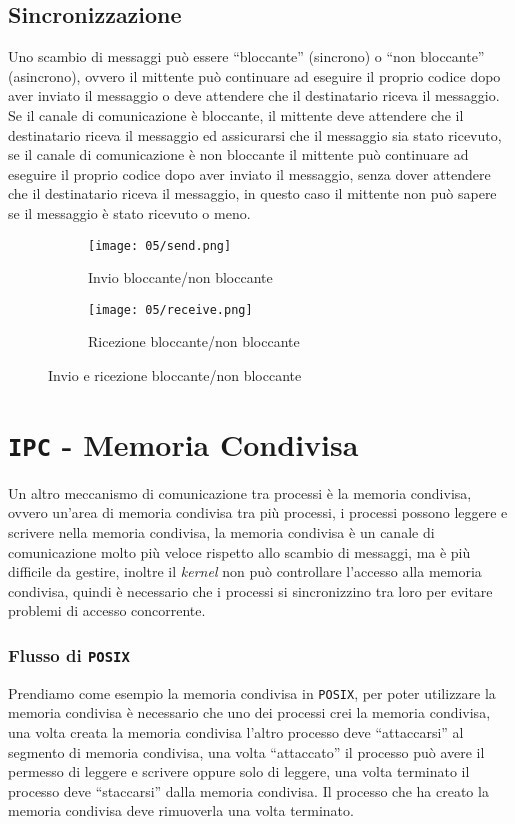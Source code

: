     \subsection{Sincronizzazione} 
        Uno scambio di messaggi può essere ``bloccante'' (sincrono) o ``non bloccante'' (asincrono), ovvero il mittente può continuare ad eseguire il proprio codice dopo aver inviato il messaggio o deve attendere che il destinatario riceva il messaggio.\newline
        Se il canale di comunicazione è bloccante, il mittente deve attendere che il destinatario riceva il messaggio ed assicurarsi che il messaggio sia stato ricevuto, se il canale di comunicazione è non bloccante il mittente può continuare ad eseguire il proprio codice dopo aver inviato il messaggio, senza dover attendere che il destinatario riceva il messaggio, in questo caso il mittente non può sapere se il messaggio è stato ricevuto o meno.
        \begin{figure}[H]
            \begin{subfigure}{0.45\textwidth}
                \centering
                \texttt{[image: 05/send.png]}
                \caption{Invio bloccante/non bloccante}
            \end{subfigure}
            \begin{subfigure}{0.45\textwidth}
                \centering
                \texttt{[image: 05/receive.png]}
                \caption{Ricezione bloccante/non bloccante}
            \end{subfigure}
            \caption{Invio e ricezione bloccante/non bloccante}
        \end{figure}

\section{\texttt{IPC} - Memoria Condivisa}
    Un altro meccanismo di comunicazione tra processi è la memoria condivisa, ovvero un'area di memoria condivisa tra più processi, i processi possono leggere e scrivere nella memoria condivisa, la memoria condivisa è un canale di comunicazione molto più veloce rispetto allo scambio di messaggi, ma è più difficile da gestire, inoltre il \textit{kernel} non può controllare l'accesso alla memoria condivisa, quindi è necessario che i processi si sincronizzino tra loro per evitare problemi di accesso concorrente.
    \subsubsection{Flusso di \texttt{POSIX}}
        Prendiamo come esempio la memoria condivisa in \texttt{POSIX}, per poter utilizzare la memoria condivisa è necessario che uno dei processi crei la memoria condivisa, una volta creata la memoria condivisa l'altro processo deve ``attaccarsi'' al segmento di memoria condivisa, una volta ``attaccato'' il processo può avere il permesso di leggere e scrivere oppure solo di leggere, una volta terminato il processo deve ``staccarsi'' dalla memoria condivisa. Il processo che ha creato la memoria condivisa deve rimuoverla una volta terminato.

